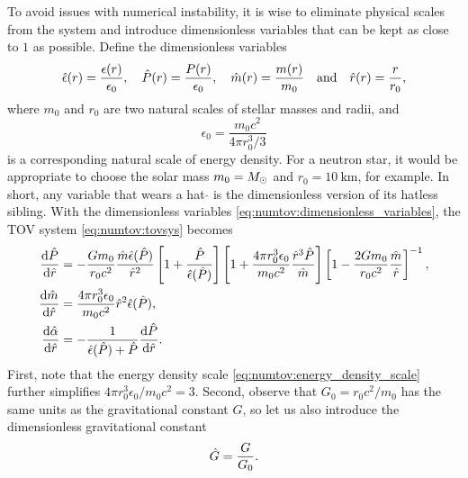 To avoid issues with numerical instability, it is wise to eliminate physical scales from the system and introduce dimensionless variables that can be kept as close to $1$ as possible.
Define the dimensionless variables
\begin{equation}
	\hat{\epsilon}(r) = \frac{\epsilon(r)}{\epsilon_0}, \quad
	\hat{P}(r) = \frac{P(r)}{\epsilon_0}, \quad
	\hat{m}(r) = \frac{m(r)}{m_0} \quad \text{and} \quad
	\hat{r}(r) = \frac{r}{r_0},
\label{eq:numtov:dimensionless_variables}
\end{equation}
where $m_0$ and $r_0$ are two natural scales of stellar masses and radii, and
\begin{equation}
	\epsilon_0 = \frac{m_0 c^2}{4 \pi r_0^3 / 3}
\label{eq:numtov:energy_density_scale}
\end{equation}
is a corresponding natural scale of energy density.
For a neutron star, it would be appropriate to choose the solar mass $m_0 = M_\odot$ and $r_0 = \SI{10}{\kilo\meter}$, for example.
In short, any variable that wears a hat $\hat{}$ is the dimensionless version of its hatless sibling.
With the dimensionless variables \eqref{eq:numtov:dimensionless_variables}, the TOV system \eqref{eq:numtov:tovsys} becomes
\begin{subequations}
\label{eq:numtov:tovsys_dimless_complicated}
\begin{align}
	\odv{\diml{P}}{\diml{r}} &= -\frac{G m_0}{r_0 c^2} \frac{\diml{m} \diml{\epsilon}(\diml{P})}{\diml{r}^2} \left[ 1 + \frac{\diml{P}}{\diml{\epsilon}(\diml{P})} \right] \left[ 1 + \frac{4 \pi r_0^3 \epsilon_0}{m_0 c^2} \frac{\diml{r}^3 \diml{P}}{\diml{m}} \right] \left[ 1 - \frac{2 G m_0}{r_0 c^2} \frac{\diml{m}}{\diml{r}} \right]^{-1} , \\
	\odv{\diml{m}}{\diml{r}} &= \frac{4 \pi r_0^3 \epsilon_0}{m_0 c^2} \diml{r}^2\diml{\epsilon}(\diml{P}) , \\
	\odv{\diml{\alpha}}{\diml{r}} &= -\frac{1}{\diml{\epsilon}(\diml{P})+\diml{P}} \odv{\diml{P}}{\diml{r}} .
\end{align}
\end{subequations}
First, note that the energy density scale \eqref{eq:numtov:energy_density_scale} further simplifies $4 \pi r_0^3 \epsilon_0 / m_0 c^2 = 3$.
Second, observe that $G_0 = r_0 c^2 / m_0$ has the same units as the gravitational constant $G$, so let us also introduce the dimensionless gravitational constant
\begin{equation}
	\hat{G} = \frac{G}{G_0} .
\label{eq:numtov:dimensionless_gravitational_constant}
\end{equation}
